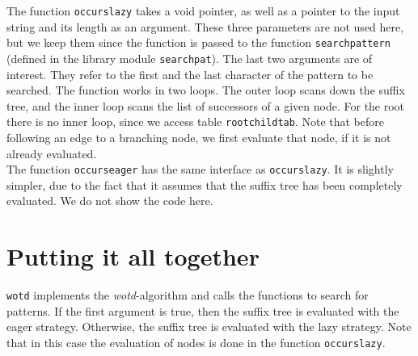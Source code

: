 \documentclass[a4paper]{article}
\begin{document}
The function \texttt{occurslazy} takes a void pointer, as well as a pointer to
the input string and its length as an argument. These three parameters are not
used here, but we keep them since the function is passed to the function
\texttt{searchpattern} (defined in the library module \texttt{searchpat}). The
last two arguments are of interest. They refer to the first and the last
character of the pattern to be searched. The function works in two loops. The
outer loop scans down the suffix tree, and the inner loop scans the list of
successors of a given node. For the root there is no inner loop, since we
access table \texttt{rootchildtab}. Note that before following an edge to a
branching node, we first evaluate that node, if it is not already evaluated.\\


The function \texttt{occurseager} has the same interface as
\texttt{occurslazy}. It is slightly simpler, due to the fact that it assumes
that the suffix tree has been completely evaluated. We do not show the code
here.

\section{Putting it all together}

\texttt{wotd} implements the \emph{wotd}-algorithm and calls the functions to
search for patterns. If the first argument is true, then the suffix tree is
evaluated with the eager strategy. Otherwise, the suffix tree is evaluated with
the lazy strategy. Note that in this case the evaluation of nodes is done in
the function \texttt{occurslazy}.
\end{document}
